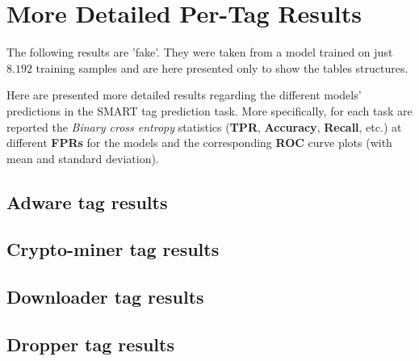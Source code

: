 \documentclass[pdfa%
,cucitura%
]{toptesi}
\begin{document}
\section{More Detailed Per-Tag Results}
\color{Green}
The following results are 'fake'. They were taken from a model trained on just $8.192$ training samples and are here presented only to show the tables structures.
\color{Black}

Here are presented more detailed results regarding the different models' predictions in the SMART tag prediction task. More specifically, for each task are reported the \textit{Binary cross entropy} statistics (\textbf{TPR}, \textbf{Accuracy}, \textbf{Recall}, etc.) at different \textbf{FPRs} for the models and the corresponding \textbf{ROC} curve plots (with mean and standard deviation).
\subsection{Adware tag results}
\adwareTagResultsAtFprTable

\adwareTagRocAloha

\adwareTagRocJointEmbedding

\adwareTagRocProposedMethod

\subsection{Crypto-miner tag results}
\cryptoMinerTagResultsAtFprTable

\cryptoMinerTagRocAloha

\cryptoMinerTagRocJointEmbedding

\cryptoMinerTagRocProposedMethod

\subsection{Downloader tag results}
\downloaderTagResultsAtFprTable

\downloaderTagRocAloha

\downloaderTagRocJointEmbedding

\downloaderTagRocProposedMethod

\subsection{Dropper tag results}
\dropperTagResultsAtFprTable

\dropperTagRocAloha

\dropperTagRocJointEmbedding
\end{document}
